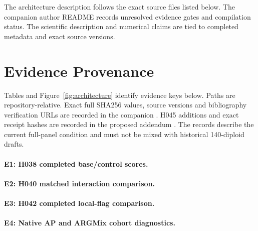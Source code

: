 \documentclass[letterpaper]{article}
\begin{document}
The architecture description follows the exact source files listed below. The companion author README records unresolved evidence gates and compilation status. The scientific description and numerical claims are tied to completed metadata and exact source versions.

\section{Evidence Provenance}
\label{app:provenance}
Tables and Figure~\ref{fig:architecture} identify evidence keys below. Paths are repository-relative. Exact full SHA256 values, source versions and bibliography verification URLs are recorded in the companion
. H045 additions and exact receipt hashes are recorded in the proposed addendum .
The records describe the current full-panel condition and must not be mixed with historical 140-diploid drafts.
\paragraph{E1: H038 completed base/control scores.}
\noindent{}\par
\noindent{}\par
\noindent{}\par
\paragraph{E2: H040 matched interaction comparison.}
\noindent{}\par
\paragraph{E3: H042 completed local-flag comparison.}
\noindent{}\par
\paragraph{E4: Native AP and ARGMix cohort diagnostics.}
\noindent{}\par
\end{document}
